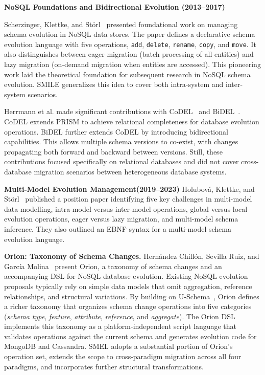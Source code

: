 \textbf{NoSQL Foundations and Bidirectional Evolution (2013--2017)}

Scherzinger, Klettke, and Störl~\cite{scherzinger2013managing} presented foundational work on managing schema evolution in NoSQL data stores. The   paper defines a declarative schema evolution language with five operations, \texttt{add}, \texttt{delete}, \texttt{rename}, \texttt{copy}, and \texttt{move}. It also distinguishes between eager migration (batch processing of all entities) and lazy migration (on-demand migration when entities are accessed). This pioneering work laid the theoretical foundation for subsequent research in NoSQL schema evolution. SMILE  generalizes this
idea to cover both intra-system and inter-system scenarios.

Herrmann et al. made significant contributions with CoDEL~\cite{herrmann2015codel}
and BiDEL~\cite{herrmann2017living}. CoDEL extends PRISM to achieve relational
completeness for database evolution operations. BiDEL further extends CoDEL by
introducing bidirectional capabilities. This allows multiple schema versions to
co-exist, with changes propagating both forward and backward between versions.
Still, these contributions focused specifically on relational databases and did
not cover cross-database migration scenarios between heterogeneous database systems.

\textbf{Multi-Model Evolution Management(2019--2023)}
Holubová, Klettke, and Störl~\cite{holubova2019evolution} published  a position paper identifying five key challenges in multi-model data modelling, intra-model versus inter-model operations, global versus local
evolution operations, eager versus lazy migration, and multi-model schema
inference. They also outlined an EBNF syntax for a multi-model schema evolution language.

\textbf{Orion: Taxonomy of Schema Changes.}
Hernández Chillón, Sevilla Ruiz, and García Molina~\cite{chillon2022taxonomy} present Orion, a taxonomy of schema changes and an accompanying DSL for NoSQL database evolution. Existing NoSQL evolution proposals typically rely on simple data models that omit aggregation, reference relationships, and structural variations. By building on U-Schema~\cite{candel2022unified}, Orion defines a richer taxonomy that organizes schema change operations into five categories (\emph{schema type}, \emph{feature}, \emph{attribute}, \emph{reference}, and \emph{aggregate}). The Orion DSL implements this taxonomy as a platform-independent script language that validates operations against the current schema and generates evolution code for MongoDB and Cassandra. SMEL adopts a substantial portion of Orion's operation set, extends the scope to cross-paradigm migration across all four paradigms, and incorporates further structural transformations.



